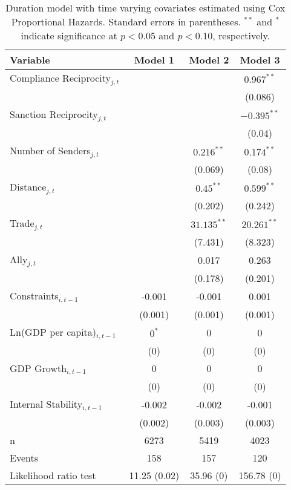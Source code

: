 \begin{table}[ht]
\centering
{\normalsize
\begin{tabular}{lccc}
 Variable & Model 1 & Model 2 & Model 3 \\ 
  \hline
\hline
Compliance Reciprocity$_{j,t}$ &  &  & $0.967^{\ast\ast}$ \\ 
   &  &  & (0.086) \\ 
  Sanction Reciprocity$_{j,t}$ &  &  & $-0.395^{\ast\ast}$ \\ 
   &  &  & (0.04) \\ 
   \hline
Number of Senders$_{j,t}$ &  & $0.216^{\ast\ast}$ & $0.174^{\ast\ast}$ \\ 
   &  & (0.069) & (0.08) \\ 
  Distance$_{j,t}$ &  & $0.45^{\ast\ast}$ & $0.599^{\ast\ast}$ \\ 
   &  & (0.202) & (0.242) \\ 
  Trade$_{j,t}$ &  & $31.135^{\ast\ast}$ & $20.261^{\ast\ast}$ \\ 
   &  & (7.431) & (8.323) \\ 
  Ally$_{j,t}$ &  & 0.017 & 0.263 \\ 
   &  & (0.178) & (0.201) \\ 
   \hline
Constraints$_{i,t-1}$ & -0.001 & -0.001 & 0.001 \\ 
   & (0.001) & (0.001) & (0.001) \\ 
  Ln(GDP per capita)$_{i,t-1}$ & $0^{\ast}$ & 0 & 0 \\ 
   & (0) & (0) & (0) \\ 
  GDP Growth$_{i,t-1}$ & 0 & 0 & 0 \\ 
   & (0) & (0) & (0) \\ 
  Internal Stability$_{i,t-1}$ & -0.002 & -0.002 & -0.001 \\ 
   & (0.002) & (0.003) & (0.003) \\ 
   \hline
n & 6273 & 5419 & 4023 \\ 
  Events & 158 & 157 & 120 \\ 
  Likelihood ratio test & 11.25 (0.02) & 35.96 (0) & 156.78 (0) \\ 
   \hline
\hline
\end{tabular}
}
\caption{Duration model with time varying covariates estimated using Cox Proportional Hazards. Standard errors in parentheses. $^{**}$ and $^{*}$ indicate significance at $p< 0.05 $ and $p< 0.10 $, respectively.} 
\end{table}
